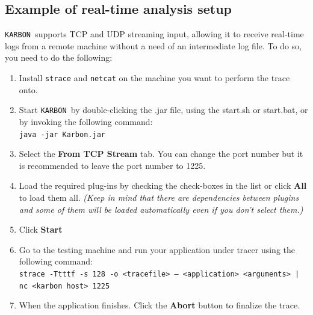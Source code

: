 \documentclass[12pt,a4paper]{scrreprt}
\newcommand{\karbon}{\texttt{KARBON {}}}
\begin{document}
\subsection{Example of real-time analysis setup}
\karbon supports TCP and UDP streaming input, allowing it to receive real-time logs from a remote machine without a need of an intermediate log file. To do so, you need to do the following:
\begin{enumerate}
	\item Install {\tt strace} and {\tt netcat} on the machine you want to perform the trace onto.
	\item Start \karbon by double-clicking the .jar file, using the start.sh or start.bat, or by invoking the following command:\\[0.2cm]
		{\tt java -jar Karbon.jar}
	\item Select the \textbf{From TCP Stream} tab. You can change the port number but it is recommended to leave the port number to 1225. 
	\item Load the required plug-ins by checking the check-boxes in the list or click \textbf{All} to load them all. \textit{(Keep in mind that there are dependencies between plugins and some of them will be loaded automatically even if you don't select them.)}
	\item Click \textbf{Start}
	\item Go to the testing machine and run your application under tracer using the following command:\\[0.2cm]
		{\tt strace -Ttttf -s 128 -o <tracefile> -- <application> <arguments> | nc <karbon host> 1225}
	\item When the application finishes. Click the \textbf{Abort} button to finalize the trace.
\end{enumerate}
\end{document}
